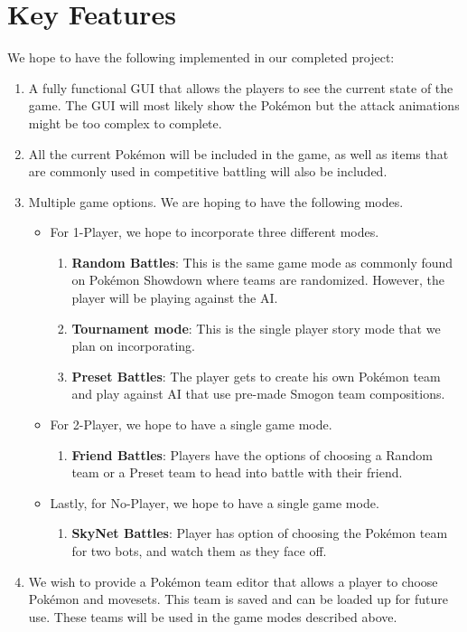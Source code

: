 \documentclass{scrreprt}
\begin{document}
\section{Key Features}
We hope to have the following implemented in our completed project:
\begin{enumerate}
	\item A fully functional GUI that allows the players to see the current state of the game. The GUI will most likely show the Pok\'emon but the attack animations might be too complex to complete. 
	\item All the current Pok\'emon will be included in the game, as well as items that are commonly used in competitive battling will also be included.
	\item Multiple game options. We are hoping to have the following modes.
		\begin{itemize}
			\item For 1-Player, we hope to incorporate three different modes. 
				\begin{enumerate}
					\item \textbf{Random Battles}: This is the same game mode as commonly found on Pok\'emon Showdown where teams are randomized. However, the player will be playing against the AI.
					\item \textbf{Tournament mode}: This is the single player story mode that we plan on incorporating.
					\item \textbf{Preset Battles}: The player gets to create his own Pok\'emon team and play against AI that use pre-made Smogon team compositions.
				\end{enumerate}
			\item For 2-Player, we hope to have a single game mode.
				\begin{enumerate}
					\item \textbf{Friend Battles}: Players have the options of choosing a Random team or a Preset team to head into battle with their friend.
				\end{enumerate}
			\item Lastly, for No-Player, we hope to have a single game mode.
				\begin{enumerate}
					\item \textbf{SkyNet Battles}: Player has option of choosing the Pok\'emon team for two bots, and watch them as they face off.
				\end{enumerate}
		\end{itemize}
	\item We wish to provide a Pok\'emon team editor that allows a player to choose Pok\'emon and movesets. This team is saved and can be loaded up for future use. These teams will be used in the game modes described above.

\end{enumerate}
\end{document}
